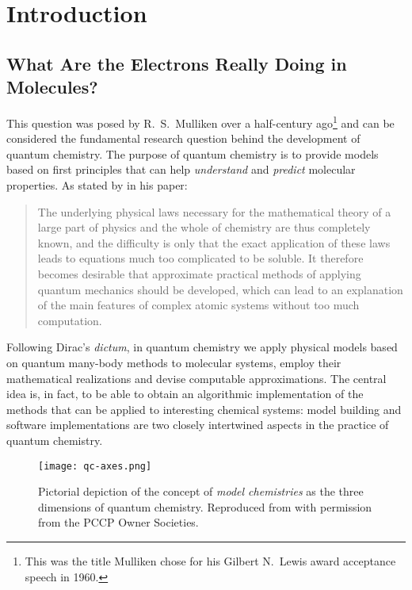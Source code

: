{}

\chapter*{Introduction}

\renewcommand{\thefigure}{\Alph{figure}}

\begin{epigraphs}
\end{epigraphs}


\section*{What Are the Electrons Really Doing in Molecules?}

This question was posed by R.~S.~Mulliken over a half-century
ago\footnote{This was the title Mulliken chose for his Gilbert N.~Lewis
award acceptance speech in 1960.}
and can be considered the fundamental research question behind the
development of quantum chemistry.
The purpose of quantum chemistry is to provide models based on first
principles that can help \emph{understand} and \emph{predict} molecular properties.
As stated by \citeauthor{Dirac1929-gn} in his 
paper:\autocite{Dirac1929-gn, Kutzelnigg2000-fl}
\blockquote{The underlying physical laws necessary for the mathematical
theory of a large part of physics and the whole of chemistry are thus
completely known, and the difficulty is only that the exact application of
these laws leads to equations much too complicated to be soluble. It
therefore becomes desirable that approximate practical methods of
applying quantum mechanics should be developed, which can lead to an
explanation of the main features of complex atomic systems without too
much computation.}
Following Dirac's \emph{dictum}, in quantum chemistry we apply physical
models based on quantum many-body methods to molecular systems, employ
their mathematical realizations and devise computable approximations.
The central idea is, in fact, to be able to obtain an algorithmic
implementation of the methods that can be applied to interesting
chemical systems: model building and software implementations are two
closely intertwined aspects in the practice of quantum chemistry.

\begin{figure}[tb]
\centering
\texttt{[image: qc-axes.png]}
\caption[Pictorial depiction of the concept of \emph{model chemistries}.]{
Pictorial depiction of the concept of \emph{model chemistries} as the
three dimensions of quantum chemistry.\autocite{Pople1999-gt, Saue2011-qg}
Reproduced from  with permission from the PCCP Owner Societies.
}
\label{fig:RQC-axis}
\end{figure}

